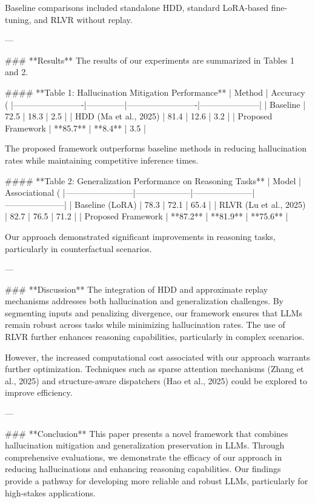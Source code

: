 Baseline comparisons included standalone HDD, standard LoRA-based fine-tuning, and RLVR without replay.

---

### **Results**  
The results of our experiments are summarized in Tables 1 and 2.

#### **Table 1: Hallucination Mitigation Performance**  
| Method                  | Accuracy (%
|-------------------------|--------------|-------------------------|---------------------|
| Baseline                | 72.5         | 18.3                    | 2.5                 |
| HDD (Ma et al., 2025)   | 81.4         | 12.6                    | 3.2                 |
| Proposed Framework      | **85.7**     | **8.4**                 | 3.5                 |

The proposed framework outperforms baseline methods in reducing hallucination rates while maintaining competitive inference times.

#### **Table 2: Generalization Performance on Reasoning Tasks**  
| Model                  | Associational (%
|------------------------|--------------------|---------------------|---------------------|
| Baseline (LoRA)        | 78.3              | 72.1                | 65.4                |
| RLVR (Lu et al., 2025) | 82.7              | 76.5                | 71.2                |
| Proposed Framework     | **87.2**          | **81.9**            | **75.6**            |

Our approach demonstrated significant improvements in reasoning tasks, particularly in counterfactual scenarios.

---

### **Discussion**  
The integration of HDD and approximate replay mechanisms addresses both hallucination and generalization challenges. By segmenting inputs and penalizing divergence, our framework ensures that LLMs remain robust across tasks while minimizing hallucination rates. The use of RLVR further enhances reasoning capabilities, particularly in complex scenarios.

However, the increased computational cost associated with our approach warrants further optimization. Techniques such as sparse attention mechanisms (Zhang et al., 2025) and structure-aware dispatchers (Hao et al., 2025) could be explored to improve efficiency.

---

### **Conclusion**  
This paper presents a novel framework that combines hallucination mitigation and generalization preservation in LLMs. Through comprehensive evaluations, we demonstrate the efficacy of our approach in reducing hallucinations and enhancing reasoning capabilities. Our findings provide a pathway for developing more reliable and robust LLMs, particularly for high-stakes applications.

